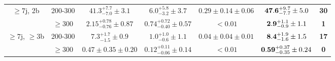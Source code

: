 \begin{table}[!ht]
{\begin{tabular}{c|c||c|c|c|c|c}
\hline
\multirow{2}{*}{$\geq7$j, 2b} & 200-300 & $41.3^{+7.7}_{-7.0}\pm3.1$ & $6.0^{+5.8}_{-3.2}\pm3.7$ & $0.29\pm0.14\pm0.06$ & ${\bf 47.6}^{+9.7}_{-7.7}\pm5.0$ & {\bf 30}\\ 
 & $\geq300$ & $2.15^{+0.78}_{-0.76}\pm0.87$ & $0.74^{+0.72}_{-0.40}\pm0.57$ & $<0.01$ & ${\bf 2.9}^{+1.1}_{-0.9}\pm1.1$ & {\bf 1}\\ 
\hline
\multirow{2}{*}{$\geq7$j, $\geq3$b} & 200-300 & $7.3^{+1.7}_{-1.5}\pm0.9$ & $1.0^{+1.0}_{-0.6}\pm1.1$ & $0.04\pm0.04\pm0.01$ & ${\bf 8.4}^{+1.9}_{-1.6}\pm1.5$ & {\bf 17}\\ 
 & $\geq300$ & $0.47\pm0.35\pm0.20$ & $0.12^{+0.11}_{-0.06}\pm0.14$ & $<0.01$ & ${\bf 0.59}^{+0.37}_{-0.35}\pm0.24$ & {\bf 0}\\ 

\hline
\end{tabular}}
\end{table}


